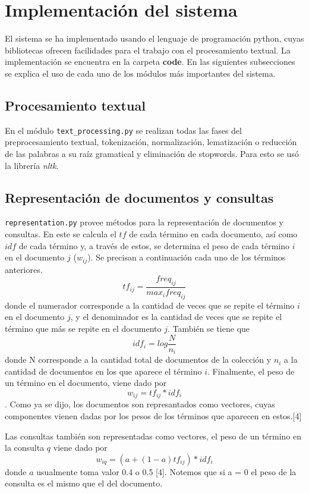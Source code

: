 \documentclass[twoside]{article}
\begin{document}
\section{Implementaci\'on del sistema}
\qquad El sistema se ha implementado usando el lenguaje de programaci\'on python, cuyas bibliotecas ofrecen facilidades para el trabajo con el procesamiento textual. La implementaci\'on se encuentra en la carpeta \textbf{code}. En las siguientes subsecciones se explica el uso de cada uno de los m\'odulos m\'as importantes del sistema.\\

\subsection{Procesamiento textual}
\qquad En el m\'odulo \texttt{text\_processing.py} se realizan todas las fases del preprocesamiento textual, tokenizaci\'on, normalizaci\'on, lematizaci\'on o reducci\'on de las palabras a su ra\'iz gramatical y eliminaci\'on de stopwords. Para esto se us\'o la librer\'ia \textit{nltk}.

\subsection{Representaci\'on de documentos y consultas}
\qquad \texttt{representation.py} provee m\'etodos para la representaci\'on de documentos y consultas. En este se calcula el $tf$ de cada t\'ermino en cada documento, as\'i como $idf$ de cada t\'ermino y, a trav\'es de estos, se determina el peso de cada t\'ermino $i$ en el documento $j$ ($w_{ij}$). Se precisan a continuaci\'on cada uno de los t\'erminos anteriores.
$$tf_{ij} = \frac{freq_{ij}}{max_i freq_{ij}}$$ donde el numerador corresponde a la cantidad de veces que se repite el t\'ermino $i$ en el documento $j$, y el denominador es la cantidad de veces que se repite el t\'ermino que m\'as se repite en el documento $j$. Tambi\'en se tiene que $$idf_i = log \frac{N}{n_i}$$ donde N corresponde a la cantidad total de documentos de la colecci\'on y $n_i$ a la cantidad de documentos en los que aparece el t\'ermino $i$. Finalmente, el peso de un t\'ermino en el documento, viene dado por $$w_{ij} = tf_{ij} * idf_i$$. Como ya se dijo, los documentos son represantados como vectores, cuyas componentes vienen dadas por los pesos de los t\'erminos que aparecen en estos.[4]

Las consultas tambi\'en son representadas como vectores, el peso de un t\'ermino en la consulta $q$ viene dado por $$w_{iq} = (a + (1 - a)tf_{ij}) * idf_i$$ donde $a$ usualmente toma valor 0.4 o 0.5 [4]. Notemos que si a = 0 el peso de la consulta es el mismo que el del documento.
\end{document}
